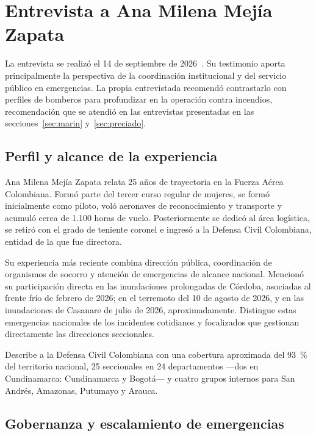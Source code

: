 \section{Entrevista a Ana Milena Mejía Zapata}\label{sec:mejia}

La entrevista se realizó el 14 de septiembre de 2026~\cite{entrevistaMejia2026}. Su testimonio aporta principalmente la perspectiva de la coordinación institucional y del servicio público en emergencias. La propia entrevistada recomendó contrastarlo con perfiles de bomberos para profundizar en la operación contra incendios, recomendación que se atendió en las entrevistas presentadas en las secciones~\ref{sec:marin} y~\ref{sec:preciado}.

\subsection{Perfil y alcance de la experiencia}

Ana Milena Mejía Zapata relata 25 años de trayectoria en la Fuerza Aérea Colombiana. Formó parte del tercer curso regular de mujeres, se formó inicialmente como piloto, voló aeronaves de reconocimiento y transporte y acumuló cerca de 1.100 horas de vuelo. Posteriormente se dedicó al área logística, se retiró con el grado de teniente coronel e ingresó a la Defensa Civil Colombiana, entidad de la que fue directora.

Su experiencia más reciente combina dirección pública, coordinación de organismos de socorro y atención de emergencias de alcance nacional. Mencionó su participación directa en las inundaciones prolongadas de Córdoba, asociadas al frente frío de febrero de 2026; en el terremoto del 10 de agosto de 2026, y en las inundaciones de Casanare de julio de 2026, aproximadamente. Distingue estas emergencias nacionales de los incidentes cotidianos y focalizados que gestionan directamente las direcciones seccionales.

Describe a la Defensa Civil Colombiana con una cobertura aproximada del 93~\% del territorio nacional, 25 seccionales en 24 departamentos ---dos en Cundinamarca: Cundinamarca y Bogotá--- y cuatro grupos internos para San Andrés, Amazonas, Putumayo y Arauca.

\subsection{Gobernanza y escalamiento de emergencias}

